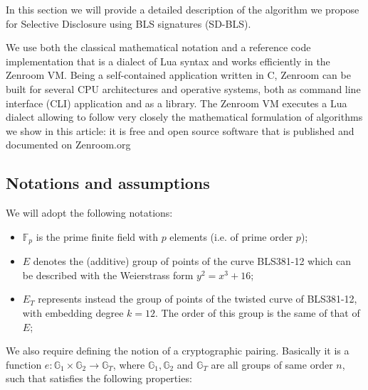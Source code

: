 \documentclass[conference]{IEEEtran}
\begin{document}
In this section we will provide a detailed description of the
algorithm we propose for Selective Disclosure using BLS signatures
(SD-BLS).

We use both the classical mathematical notation and a reference code
implementation that is a dialect of Lua syntax and works efficiently
in the Zenroom VM. Being a self-contained application written in C,
Zenroom can be built for several CPU architectures and operative
systems, both as command line interface (CLI) application and as a
library. The Zenroom VM executes a Lua dialect allowing to follow very
closely the mathematical formulation of algorithms we show in this
article: it is free and open source software that is published and
documented on Zenroom.org

\subsection{Notations and assumptions}

We will adopt the following notations:
\begin{itemize}

\item $\mathbb{F}_p$ is the prime finite field with $p$ elements
  (i.e. of prime order $p$);

\item $E$ denotes the (additive) group of points of the curve
  BLS381-12 \cite{bls381-12} which can be described with the
  Weierstrass form $y^2=x^3 + 16$;

\item $E_T$ represents instead the group of points of the twisted
  curve of BLS381-12, with embedding degree $k=12$. The order of
  this group is the same of that of $E$;

\end{itemize}

We also require defining the notion of a cryptographic
pairing. Basically it is a function $e:
\mathbb{G}_1\times\mathbb{G}_2\to \mathbb{G}_T$, where
$\mathbb{G}_1,\mathbb{G}_2$ and $\mathbb{G}_T$ are all groups of same
order $n$, such that satisfies the following properties:
\end{document}
